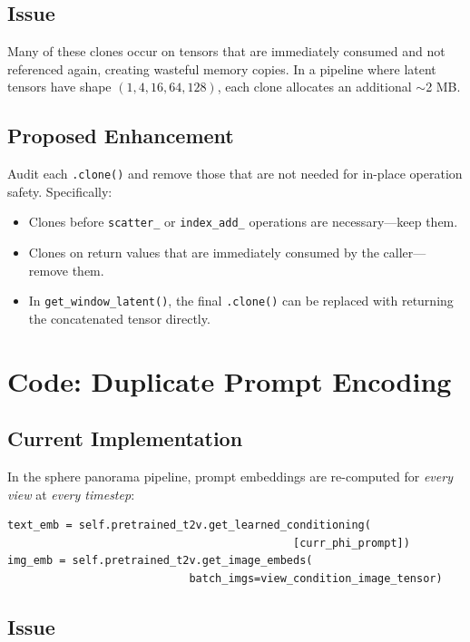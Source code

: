 \documentclass[11pt,a4paper]{article}
\newcommand{\fn}[1]{\texttt{#1}}
\begin{document}
\subsection{Issue}

Many of these clones occur on tensors that are immediately consumed and not referenced again, creating wasteful memory copies.
In a pipeline where latent tensors have shape $(1, 4, 16, 64, 128)$, each clone allocates an additional $\sim$2 MB.

\subsection{Proposed Enhancement}

Audit each \fn{.clone()} and remove those that are not needed for in-place operation safety.
Specifically:
\begin{itemize}
    \item Clones before \fn{scatter\_} or \fn{index\_add\_} operations are necessary---keep them.
    \item Clones on return values that are immediately consumed by the caller---remove them.
    \item In \fn{get\_window\_latent()}, the final \fn{.clone()} can be replaced with returning the concatenated tensor directly.
\end{itemize}

\section{Code: Duplicate Prompt Encoding}

\subsection{Current Implementation}

In the sphere panorama pipeline, prompt embeddings are re-computed for \emph{every view} at \emph{every timestep}:
\begin{lstlisting}
text_emb = self.pretrained_t2v.get_learned_conditioning(
                                            [curr_phi_prompt])
img_emb = self.pretrained_t2v.get_image_embeds(
                            batch_imgs=view_condition_image_tensor)
\end{lstlisting}

\subsection{Issue}
\end{document}
